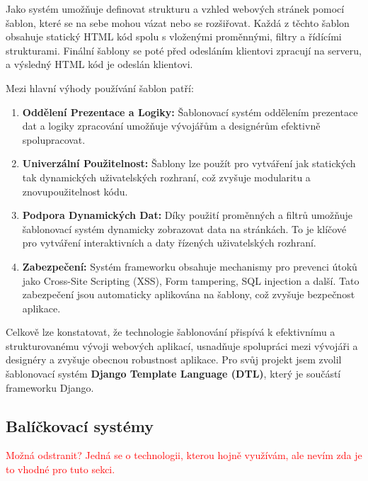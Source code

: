 Jako systém umožňuje definovat strukturu a vzhled webových stránek pomocí šablon, které se na sebe mohou vázat nebo se rozšiřovat. Každá z těchto šablon obsahuje statický HTML kód spolu s vloženými proměnnými, filtry a řídícími strukturami. Finální šablony se poté před odesláním klientovi zpracují na serveru, a výsledný HTML kód je odeslán klientovi.

Mezi hlavní výhody používání šablon patří:
\begin{enumerate}
    \item \textbf{Oddělení Prezentace a Logiky:} Šablonovací systém oddělením prezentace dat a logiky zpracování umožňuje vývojářům a designérům efektivně spolupracovat.
    \item \textbf{Univerzální Použitelnost:} Šablony lze použít pro vytváření jak statických tak dynamických uživatelských rozhraní, což zvyšuje modularitu a znovupoužitelnost kódu.
    \item \textbf{Podpora Dynamických Dat:} Díky použití proměnných a filtrů umožňuje šablonovací systém dynamicky zobrazovat data na stránkách. To je klíčové pro vytváření interaktivních a daty řízených uživatelských rozhraní.
    \item \textbf{Zabezpečení:} Systém frameworku obsahuje mechanismy pro prevenci útoků jako Cross-Site Scripting (XSS), Form tampering, SQL injection a další. Tato zabezpečení jsou automaticky aplikována na šablony, což zvyšuje bezpečnost aplikace.
\end{enumerate}

Celkově lze konstatovat, že technologie šablonování přispívá k efektivnímu a strukturovanému vývoji webových aplikací, usnadňuje spolupráci mezi vývojáři a designéry a zvyšuje obecnou robustnost aplikace. Pro svůj projekt jsem zvolil šablonovací systém \textbf{Django Template Language (DTL)}, který je součástí frameworku Django.
\\



\subsection{Balíčkovací systémy}
\label{subsec:dev-technology-package-managers}

\textcolor{red}{Možná odstranit? Jedná se o technologii, kterou hojně využívám, ale nevím zda je to vhodné pro tuto sekci.}

